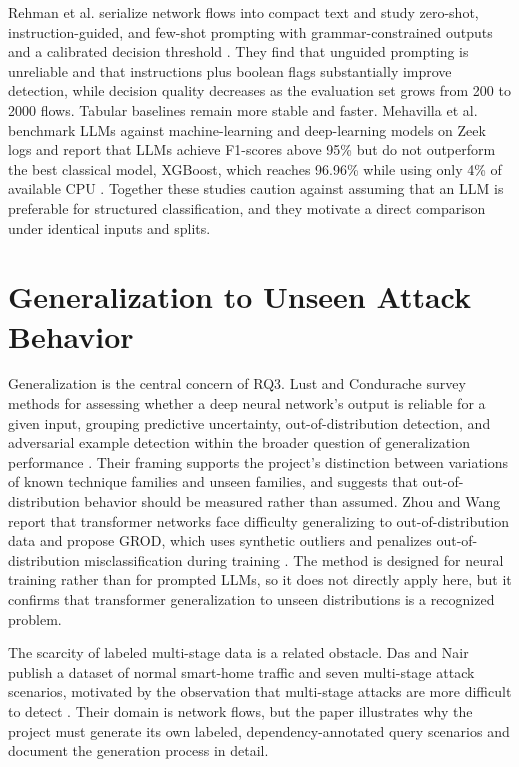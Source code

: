 \documentclass[12pt,a4paper]{report}
\begin{document}
Rehman et al. serialize network flows into compact text and study zero-shot, instruction-guided, and few-shot prompting with grammar-constrained outputs and a calibrated decision threshold \cite{rehman_flows_2025}. They find that unguided prompting is unreliable and that instructions plus boolean flags substantially improve detection, while decision quality decreases as the evaluation set grows from 200 to 2000 flows. Tabular baselines remain more stable and faster. Mehavilla et al. benchmark LLMs against machine-learning and deep-learning models on Zeek logs and report that LLMs achieve F1-scores above 95\% but do not outperform the best classical model, XGBoost, which reaches 96.96\% while using only 4\% of available CPU \cite{mehavilla_evaluating_2026}. Together these studies caution against assuming that an LLM is preferable for structured classification, and they motivate a direct comparison under identical inputs and splits.

\section{Generalization to Unseen Attack Behavior}
Generalization is the central concern of RQ3. Lust and Condurache survey methods for assessing whether a deep neural network's output is reliable for a given input, grouping predictive uncertainty, out-of-distribution detection, and adversarial example detection within the broader question of generalization performance \cite{lust_survey_2026}. Their framing supports the project's distinction between variations of known technique families and unseen families, and suggests that out-of-distribution behavior should be measured rather than assumed. Zhou and Wang report that transformer networks face difficulty generalizing to out-of-distribution data and propose GROD, which uses synthetic outliers and penalizes out-of-distribution misclassification during training \cite{zhou_grod_2024}. The method is designed for neural training rather than for prompted LLMs, so it does not directly apply here, but it confirms that transformer generalization to unseen distributions is a recognized problem.

The scarcity of labeled multi-stage data is a related obstacle. Das and Nair publish a dataset of normal smart-home traffic and seven multi-stage attack scenarios, motivated by the observation that multi-stage attacks are more difficult to detect \cite{das_novel_2026}. Their domain is network flows, but the paper illustrates why the project must generate its own labeled, dependency-annotated query scenarios and document the generation process in detail.
\end{document}
